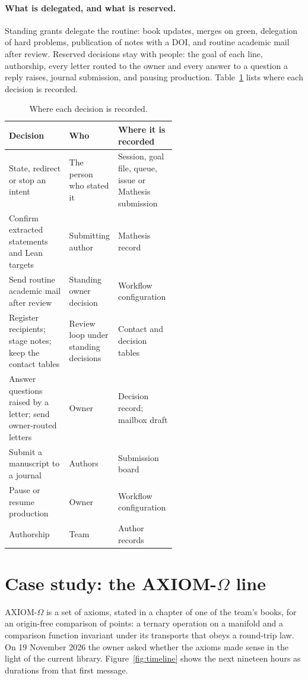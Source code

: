 \documentclass[11pt]{article}
\begin{document}
\paragraph{What is delegated, and what is reserved.} Standing grants delegate
the routine: book updates, merges on green, delegation of hard problems,
publication of notes with a DOI, and routine academic mail after review.
Reserved decisions stay with people: the goal of each line, authorship, every
letter routed to the owner and every answer to a question a reply raises,
journal submission, and pausing production. Table~\ref{tab:human} lists where
each decision is recorded.

\begin{table}[htbp]
\centering\small
\caption{Where each decision is recorded.}
\label{tab:human}
\begin{tabularx}{\linewidth}{@{}>{\raggedright\arraybackslash}p{0.36\linewidth}>{\raggedright\arraybackslash}p{0.2\linewidth}>{\raggedright\arraybackslash}X@{}}
\toprule
Decision & Who & Where it is recorded \\
\midrule
State, redirect or stop an intent & The person who stated it & Session, goal file, queue, issue or Mathesis submission \\
Confirm extracted statements and Lean targets & Submitting author & Mathesis record \\
Send routine academic mail after review & Standing owner decision & Workflow configuration \\
Register recipients; stage notes; keep the contact tables & Review loop under standing decisions & Contact and decision tables \\
Answer questions raised by a letter; send owner-routed letters & Owner & Decision record; mailbox draft \\
Submit a manuscript to a journal & Authors & Submission board \\
Pause or resume production & Owner & Workflow configuration \\
Authorship & Team & Author records \\
\bottomrule
\end{tabularx}
\end{table}

\section{Case study: the AXIOM-\texorpdfstring{$\Omega$}{Omega} line}
\label{sec:example}
AXIOM-$\Omega$ is a set of axioms, stated in a chapter of one of the team's
books, for an origin-free comparison of points: a ternary operation on a
manifold and a comparison function invariant under its transports that
obeys a round-trip law. On 19 November 2026 the owner asked whether the
axioms made sense in the light of the current library. Figure~\ref{fig:timeline}
shows the next nineteen hours as durations from that first message.
\end{document}
